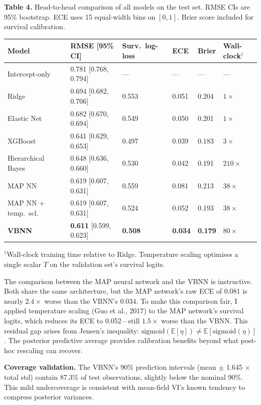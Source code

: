 \documentclass[10pt, letterpaper]{article}
\begin{document}
\begin{center}\small
\textbf{Table 4.} Head-to-head comparison of all models on the test set. RMSE CIs are 95\% bootstrap. ECE uses 15 equal-width bins on $[0, 1]$. Brier score included for survival calibration.\\[4pt]
\renewcommand{\arraystretch}{1.2}
\begin{tabular}{@{}llllll@{}}
\toprule
Model & RMSE [95\% CI] & Surv.\ log-loss & ECE & Brier & Wall-clock$^\dagger$ \\
\midrule
Intercept-only       & 0.781 [0.768, 0.794] & --- & --- & --- & --- \\
Ridge                & 0.694 [0.682, 0.706] & 0.553 & 0.051 & 0.204 & $1\times$ \\
Elastic Net          & 0.682 [0.670, 0.694] & 0.549 & 0.050 & 0.201 & $1\times$ \\
XGBoost              & 0.641 [0.629, 0.653] & 0.497 & 0.039 & 0.183 & $3\times$ \\
Hierarchical Bayes   & 0.648 [0.636, 0.660] & 0.530 & 0.042 & 0.191 & $210\times$ \\
MAP NN               & 0.619 [0.607, 0.631] & 0.559 & 0.081 & 0.213 & $38\times$ \\
MAP NN + temp.\ scl. & 0.619 [0.607, 0.631] & 0.524 & 0.052 & 0.193 & $38\times$ \\
\textbf{VBNN}        & \textbf{0.611} [0.599, 0.623] & \textbf{0.508} & \textbf{0.034} & \textbf{0.179} & $80\times$ \\
\bottomrule
\end{tabular}
\end{center}
{\footnotesize $^\dagger$Wall-clock training time relative to Ridge. Temperature scaling optimises a single scalar $T$ on the validation set's survival logits.\par}

The comparison between the MAP neural network and the VBNN is instructive. Both share the same architecture, but the MAP network's raw ECE of 0.081 is nearly $2.4\times$ worse than the VBNN's 0.034. To make this comparison fair, I applied temperature scaling (Guo et al., 2017) to the MAP network's survival logits, which reduces its ECE to 0.052---still $1.5\times$ worse than the VBNN. This residual gap arises from Jensen's inequality: $\text{sigmoid}(\mathbb{E}[\eta]) \neq \mathbb{E}[\text{sigmoid}(\eta)]$. The posterior predictive average provides calibration benefits beyond what post-hoc rescaling can recover.

\textbf{Coverage validation.} The VBNN's 90\% prediction intervals (mean $\pm$ 1.645 $\times$ total std) contain 87.3\% of test observations, slightly below the nominal 90\%. This mild undercoverage is consistent with mean-field VI's known tendency to compress posterior variances.
\end{document}
